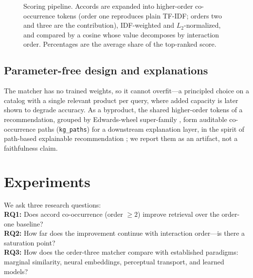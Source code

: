 \documentclass[conference]{IEEEtran}
\begin{document}
\begin{figure}[t]
\centering
{}
\caption{Scoring pipeline. Accords are expanded into higher-order co-occurrence tokens
(order one reproduces plain TF-IDF; orders two and three are the contribution),
IDF-weighted and $L_2$-normalized, and compared by a cosine whose value decomposes by
interaction order. Percentages are the average share of the top-ranked score.}
\label{fig:pipeline}
\end{figure}

\subsection{Parameter-free design and explanations}
The matcher has no trained weights, so it cannot overfit---a principled choice on a catalog
with a single relevant product per query, where added capacity is later shown to degrade
accuracy. As a byproduct, the shared higher-order tokens of a recommendation, grouped by
Edwards-wheel super-family \cite{r10}, form auditable co-occurrence paths (\texttt{kg\_paths})
for a downstream explanation layer, in the spirit of path-based explainable recommendation
\cite{r21}; we report them as an artifact, not a faithfulness claim.

\section{Experiments}\label{sec:experiments}
We ask three research questions:\\
\textbf{RQ1:} Does accord co-occurrence (order $\ge 2$) improve retrieval over the order-one
baseline?\\
\textbf{RQ2:} How far does the improvement continue with interaction order---is there a
saturation point?\\
\textbf{RQ3:} How does the order-three matcher compare with established paradigms: marginal
similarity, neural embeddings, perceptual transport, and learned models?
\end{document}

